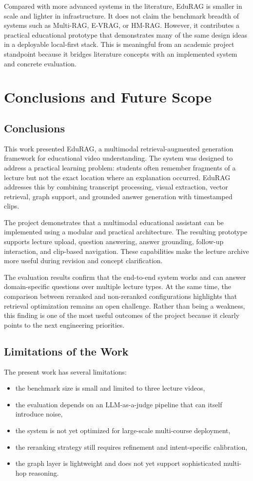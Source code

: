 \documentclass[12pt,a4paper,oneside]{report}
\begin{document}
Compared with more advanced systems in the literature, EduRAG is smaller in scale and lighter in infrastructure. It does not claim the benchmark breadth of systems such as Multi-RAG, E-VRAG, or HM-RAG. However, it contributes a practical educational prototype that demonstrates many of the same design ideas in a deployable local-first stack. This is meaningful from an academic project standpoint because it bridges literature concepts with an implemented system and concrete evaluation.

\chapter{Conclusions and Future Scope}

\section{Conclusions}
This work presented EduRAG, a multimodal retrieval-augmented generation framework for educational video understanding. The system was designed to address a practical learning problem: students often remember fragments of a lecture but not the exact location where an explanation occurred. EduRAG addresses this by combining transcript processing, visual extraction, vector retrieval, graph support, and grounded answer generation with timestamped clips.

The project demonstrates that a multimodal educational assistant can be implemented using a modular and practical architecture. The resulting prototype supports lecture upload, question answering, answer grounding, follow-up interaction, and clip-based navigation. These capabilities make the lecture archive more useful during revision and concept clarification.

The evaluation results confirm that the end-to-end system works and can answer domain-specific questions over multiple lecture types. At the same time, the comparison between reranked and non-reranked configurations highlights that retrieval optimization remains an open challenge. Rather than being a weakness, this finding is one of the most useful outcomes of the project because it clearly points to the next engineering priorities.

\section{Limitations of the Work}
The present work has several limitations:
\begin{itemize}
    \item the benchmark size is small and limited to three lecture videos,
    \item the evaluation depends on an LLM-as-a-judge pipeline that can itself introduce noise,
    \item the system is not yet optimized for large-scale multi-course deployment,
    \item the reranking strategy still requires refinement and intent-specific calibration,
    \item the graph layer is lightweight and does not yet support sophisticated multi-hop reasoning.
\end{itemize}
\end{document}
